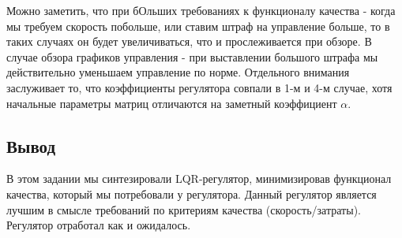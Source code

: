 Можно заметить, что при бОльших требованиях к функционалу качества - когда мы требуем скорость побольше, или ставим штраф на управление больше, то в таких случаях он будет увеличиваться, что и прослеживается при обзоре.
В случае обзора графиков управления - при выставлении большого штрафа мы действительно уменьшаем управление по норме. Отдельного внимания заслуживает то, что коэффициенты регулятора совпали в 1-м и 4-м случае, 
хотя начальные параметры матриц отличаются на заметный коэффициент $\alpha$.

\subsection{Вывод}

В этом задании мы синтезировали LQR-регулятор, минимизировав функционал качества, который мы потребовали у регулятора. Данный регулятор является лучшим в смысле требований по критериям качества (скорость/затраты).
Регулятор отработал как и ожидалось.

\endinput